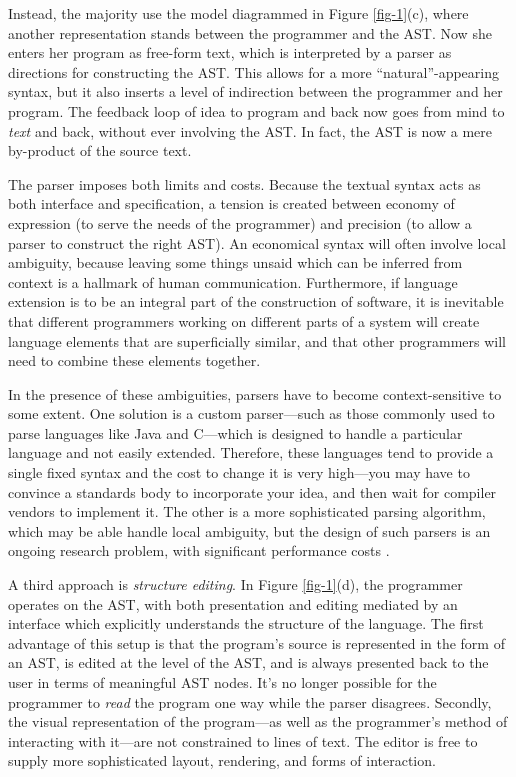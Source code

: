 Instead, the majority use the model diagrammed in Figure \ref{fig-1}(c), where another representation stands between the programmer and the AST. Now she enters her program as free-form text, which is interpreted by a parser as directions for constructing the AST. This allows for a more ``natural''-appearing syntax, but it also inserts a level of indirection between the programmer and her program. The feedback loop of idea to program and back now goes from mind to \emph{text} and back, without ever involving the AST. In fact, the AST is now a mere by-product of the source text. 

The parser imposes both limits and costs. Because the textual syntax acts as both interface and specification, a tension is created between economy of expression (to serve the needs of the programmer) and precision (to allow a parser to construct the right AST). An economical syntax will often involve local ambiguity, because leaving some things unsaid which can be inferred from context is a hallmark of human communication. Furthermore, if language extension is to be an integral part of the construction of software, it is inevitable that different programmers working on different parts of a system will create language elements that are superficially similar, and that other programmers will need to combine these elements together.

In the presence of these ambiguities, parsers have to become context-sensitive to some extent. One solution is a custom parser---such as those commonly used to parse languages like Java and C---which is designed to handle a particular language and not easily extended. Therefore, these languages tend to provide a single fixed syntax and the cost to change it is very high---you may have to convince a standards body to incorporate your idea, and then wait for compiler vendors to implement it. The other is a more sophisticated parsing algorithm, which may be able handle local ambiguity, but the design of such parsers is an ongoing research problem, with significant performance costs \cite{frost}. 

A third approach is \emph{structure editing}. In Figure \ref{fig-1}(d), the programmer operates on the AST, with both presentation and editing mediated by an interface which explicitly understands the structure of the language. The first advantage of this setup is that the program's source is represented in the form of an AST, is edited at the level of the AST, and is always presented back to the user in terms of meaningful AST nodes. It's no longer possible for the programmer to \emph{read} the program one way while the parser disagrees. Secondly, the visual representation of the program---as well as the programmer's method of interacting with it---are not constrained to lines of text. The editor is free to supply more sophisticated layout, rendering, and forms of interaction.


